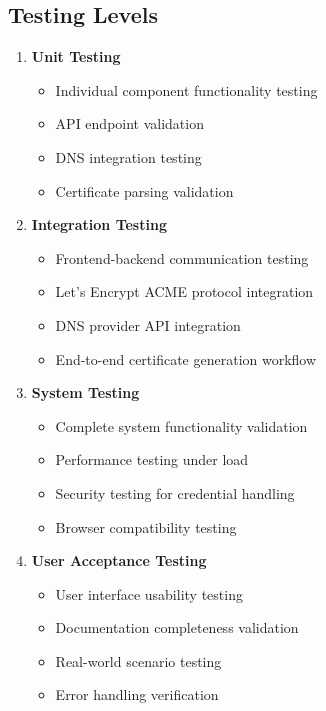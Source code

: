 \subsection{Testing Levels}

\begin{enumerate}
    \item \textbf{Unit Testing}
    \begin{itemize}
        \item Individual component functionality testing
        \item API endpoint validation
        \item DNS integration testing
        \item Certificate parsing validation
    \end{itemize}
    
    \item \textbf{Integration Testing}
    \begin{itemize}
        \item Frontend-backend communication testing
        \item Let's Encrypt ACME protocol integration
        \item DNS provider API integration
        \item End-to-end certificate generation workflow
    \end{itemize}
    
    \item \textbf{System Testing}
    \begin{itemize}
        \item Complete system functionality validation
        \item Performance testing under load
        \item Security testing for credential handling
        \item Browser compatibility testing
    \end{itemize}
    
    \item \textbf{User Acceptance Testing}
    \begin{itemize}
        \item User interface usability testing
        \item Documentation completeness validation
        \item Real-world scenario testing
        \item Error handling verification
    \end{itemize}
\end{enumerate}

